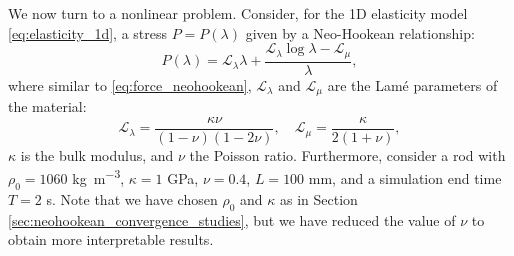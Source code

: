 \documentclass{sfuthesis}
\numberwithin{equation}{section}
\numberwithin{figure}{chapter}
\numberwithin{table}{chapter}
\theoremstyle{definition}
\begin{document}
We now turn to a nonlinear problem. Consider, for the 1D elasticity model \eqref{eq:elasticity_1d}, a stress $P = P(\lambda)$  given by a Neo-Hookean relationship:
\begin{equation} \label{eq:neohookean_stress_1d}
    P(\lambda) = \mathcal{L}_\lambda \lambda + \dfrac{\mathcal{L}_\lambda \log \lambda - \mathcal{L}_\mu}{\lambda},
\end{equation}
where similar to \eqref{eq:force_neohookean}, $\mathcal{L}_\lambda$ and $\mathcal{L}_\mu$ are the Lam\'e parameters of the material:
\begin{equation}
    \mathcal{L}_{\lambda} = \dfrac{\kappa\nu}{(1-\nu)(1-2\nu)}, \quad \mathcal{L}_{\mu} = \dfrac{\kappa}{2(1+\nu)},
\end{equation}
$\kappa$ is the bulk modulus, and $\nu$ the Poisson ratio. Furthermore, consider a rod with $\rho_0 = 1060$ \si{kg.m^{-3}}, $\kappa = 1$ \si{GPa}, $\nu = 0.4$, $L = 100$ \si{mm}, and a simulation end time $T = 2$ s. Note that we have chosen $\rho_0$ and $\kappa$ as in Section \ref{sec:neohookean_convergence_studies}, but we have reduced the value of $\nu$ to obtain more interpretable results.
\end{document}
